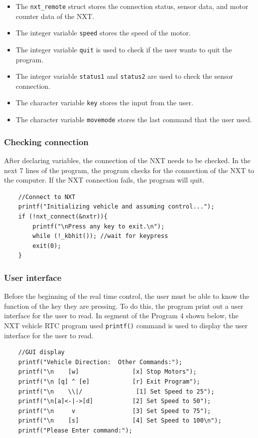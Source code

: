 \documentclass[12pt]{article}
\begin{document}
\begin{itemize}
\item The \verb+nxt_remote+ struct stores the connection status, sensor data, and motor counter data of the NXT.
\item The integer variable \verb+speed+ stores the speed of the motor.
\item The integer variable \verb+quit+ is used to check if the user wants to quit the program.
\item The integer variable \verb+status1+ and \verb+status2+ are used to check the sensor connection.
\item The character variable \verb+key+ stores the input from the user.
\item The character variable \verb+movemode+ stores the last command that the user used.
\end{itemize}

\subsubsection*{Checking connection}
After declaring variables, the connection of the NXT needs to be checked.
In the next 7 lines of the program, the program checks for the connection of the NXT to the computer.
If the NXT connection fails, the program will quit.
\begin{verbatim}
    //Connect to NXT
    printf("Initializing vehicle and assuming control...");
    if (!nxt_connect(&nxtr)){
        printf("\nPress any key to exit.\n");
        while (!_kbhit()); //wait for keypress
        exit(0);
    }
\end{verbatim}

\subsubsection*{User interface}
Before the beginning of the real time control, the user must be able to know the function of the key they are pressing.
To do this, the program print out a user interface for the user to read. 
In segment of the Program 4 shown below, the NXT vehicle RTC program used \verb+printf()+ command is used to display the
    user interface for the user to read.
\begin{verbatim}
    //GUI display
    printf("Vehicle Direction:  Other Commands:");
    printf("\n    [w]               [x] Stop Motors");
    printf("\n [q] ^ [e]            [r] Exit Program");
    printf("\n    \\|/               [1] Set Speed to 25");
    printf("\n[a]<-|->[d]           [2] Set Speed to 50");
    printf("\n     v                [3] Set Speed to 75");
    printf("\n    [s]               [4] Set Speed to 100\n");
    printf("Please Enter command:");
\end{verbatim}
\end{document}
